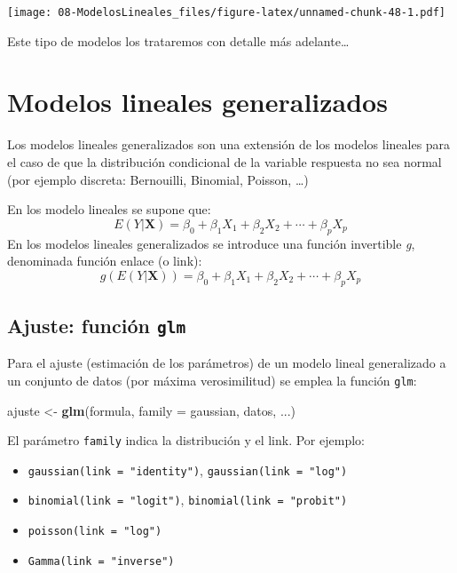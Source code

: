 \documentclass[]{book}
\newenvironment{Shaded}{\begin{snugshade}}{\end{snugshade}}
\newcommand{\DataTypeTok}[1]{\textcolor[rgb]{0.13,0.29,0.53}{#1}}
\newcommand{\KeywordTok}[1]{\textcolor[rgb]{0.13,0.29,0.53}{\textbf{#1}}}
\newcommand{\NormalTok}[1]{#1}
\newcommand{\StringTok}[1]{\textcolor[rgb]{0.31,0.60,0.02}{#1}}
\begin{document}
\texttt{[image: 08-ModelosLineales\_files/figure-latex/unnamed-chunk-48-1.pdf]}

Este tipo de modelos los trataremos con detalle más adelante\ldots{}

\hypertarget{modelos-lineales-generalizados}{%
\chapter{Modelos lineales generalizados}\label{modelos-lineales-generalizados}}

Los modelos lineales generalizados son una extensión de los modelos lineales para el caso de que la distribución condicional de la variable respuesta no sea normal (por ejemplo discreta: Bernouilli, Binomial, Poisson, \ldots{})

En los modelo lineales se supone que:
\[E( Y | \mathbf{X} ) = \beta_{0}+\beta_{1}X_{1}+\beta_{2}X_{2}+\cdots+\beta_{p}X_{p}\]
En los modelos lineales generalizados se introduce una función invertible \emph{g}, denominada función enlace (o link):
\[g\left(E(Y | \mathbf{X} )\right) = \beta_{0}+\beta_{1}X_{1}+\beta_{2}X_{2}+\cdots+\beta_{p}X_{p}\]

\hypertarget{ajuste-funcion-glm}{%
\section{\texorpdfstring{Ajuste: función \texttt{glm}}{Ajuste: función glm}}\label{ajuste-funcion-glm}}

Para el ajuste (estimación de los parámetros) de un modelo lineal generalizado a un conjunto de datos (por máxima verosimilitud) se emplea la función \texttt{glm}:

\begin{Shaded}
\begin{Highlighting}[]
\NormalTok{ajuste <-}\StringTok{ }\KeywordTok{glm}\NormalTok{(formula, }\DataTypeTok{family =}\NormalTok{ gaussian, datos, ...)}
\end{Highlighting}
\end{Shaded}

El parámetro \texttt{family} indica la distribución y el link. Por ejemplo:

\begin{itemize}
\item
  \texttt{gaussian(link\ =\ "identity")}, \texttt{gaussian(link\ =\ "log")}
\item
  \texttt{binomial(link\ =\ "logit")}, \texttt{binomial(link\ =\ "probit")}
\item
  \texttt{poisson(link\ =\ "log")}
\item
  \texttt{Gamma(link\ =\ "inverse")}
\end{itemize}
\end{document}
